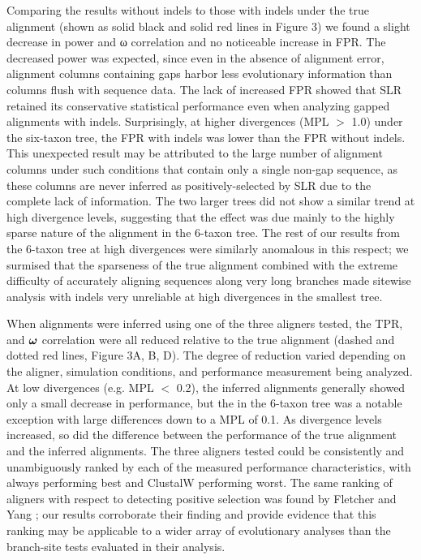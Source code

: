 \documentclass{mbe}
\begin{document}
Comparing the results without indels to those with indels under the
true alignment (shown as solid black and solid red lines in Figure 3)
we found a slight decrease in power and ω correlation and no
noticeable increase in FPR. The decreased power was expected, since
even in the absence of alignment error, alignment columns containing
gaps harbor less evolutionary information than columns flush with
sequence data. The lack of increased FPR showed that SLR retained its
conservative statistical performance even when analyzing gapped
alignments with indels. Surprisingly, at higher divergences (MPL $>$
1.0) under the six-taxon tree, the FPR with indels was lower than the
FPR without indels. This unexpected result may be attributed to the
large number of alignment columns under such conditions that contain
only a single non-gap sequence, as these columns are never inferred as
positively-selected by SLR due to the complete lack of
information. The two larger trees did not show a similar trend at high
divergence levels, suggesting that the effect was due mainly to the
highly sparse nature of the alignment in the 6-taxon tree. The rest of
our results from the 6-taxon tree at high divergences were similarly
anomalous in this respect; we surmised that the sparseness of the true
alignment combined with the extreme difficulty of accurately aligning
sequences along very long branches made sitewise analysis with indels
very unreliable at high divergences in the smallest tree.

When alignments were inferred using one of the three aligners tested,
the TPR, \tpr{} and $\bm{\omega}{}$ correlation were all reduced relative to
the true alignment (dashed and dotted red lines, Figure 3A, B, D). The
degree of reduction varied depending on the aligner, simulation
conditions, and performance measurement being analyzed. At low
divergences (e.g. MPL $<$ 0.2), the inferred alignments generally
showed only a small decrease in performance, but the \tpr{} in the
6-taxon tree was a notable exception with large differences down to a
MPL of 0.1. As divergence levels increased, so did the difference
between the performance of the true alignment and the inferred
alignments. The three aligners tested could be consistently and
unambiguously ranked by each of the measured performance
characteristics, with \prankc{} always performing best and ClustalW
performing worst. The same ranking of aligners with respect to
detecting positive selection was found by Fletcher and Yang
\citeyearpar{Fletcher2010Effect}; our results corroborate their
finding and provide evidence that this ranking may be applicable to a
wider array of evolutionary analyses than the branch-site tests
evaluated in their analysis.
\end{document}
